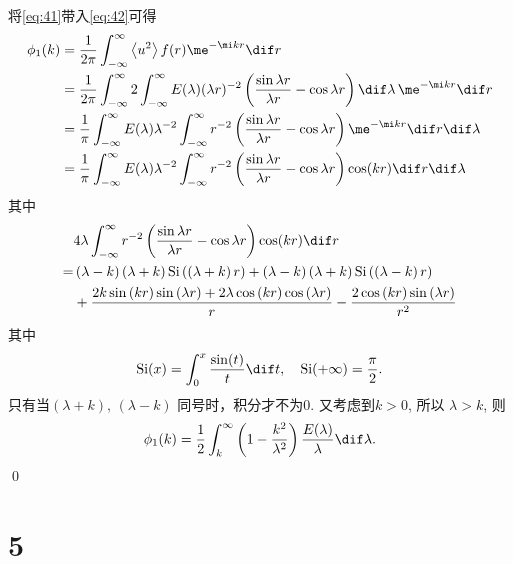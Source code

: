 \documentclass[12pt,a4]{ctexart}
\begin{document}
将\cref{eq:41}带入\cref{eq:42}可得
\begin{equation}
   \begin{aligned}
	  \phi_{1}(k) & = \frac{1}{2 \pi} \int_{-\infty}^{\infty}\left\langle u^{2}\right\rangle f(r) \me^{-\mi k r} \dif r \\ 
				  & = \frac{1}{2 \pi} \int_{-\infty}^{\infty}2 \int_{-\infty}^{\infty} E(\lambda)(\lambda r)^{-2}\left(\frac{\sin \lambda r}{\lambda r}-\cos \lambda r\right)\dif \lambda \, \me^{-\mi k r} \dif r \\
				  & = \frac{1}{ \pi} \int_{-\infty}^{\infty}E(\lambda) \lambda^{-2} \int_{-\infty}^{\infty}  r^{-2}\left(\frac{\sin \lambda r}{\lambda r}-\cos \lambda r\right) \me^{-\mi k r} \dif r \dif \lambda \\
				  & = \frac{1}{ \pi} \int_{-\infty}^{\infty}E(\lambda) \lambda^{-2} \int_{-\infty}^{\infty}  r^{-2}\left(\frac{\sin \lambda r}{\lambda r}-\cos \lambda r\right) \cos(kr) \dif r \dif \lambda \\
   \end{aligned}
\end{equation}
其中
\begin{equation}
   \begin{aligned}
	 & 4\lambda\int_{-\infty}^{\infty}  r^{-2}\left(\frac{\sin \lambda r}{\lambda r}-\cos \lambda r\right) \cos(kr) \dif r \\ 
	  = & \left(\lambda-k\right)\left(\lambda+k\right)\operatorname{Si}\left(\left(\lambda+k\right)r\right)+\left(\lambda-k\right)\left(\lambda+k\right)\operatorname{Si}\left(\left(\lambda-k\right)r\right)\\
		& +\frac{2k\sin\left(kr\right)\sin\left(\lambda r\right)+2\lambda \cos\left(kr\right)\cos\left(\lambda r\right)}{r}-\frac{2\cos\left(kr\right)\sin\left(\lambda r\right)}{r^2}
   \end{aligned}
\end{equation}
其中
\begin{equation}
   \mathrm{Si}(x) = \int^x_0 \frac{\sin(t)}{t} \dif t,\quad \mathrm{Si}(+\infty) = \frac{\pi}{2}.
\end{equation}
只有当$\left( \lambda + k \right),\, \left( \lambda - k \right) $ 同号时，积分才不为$0$. 又考虑到$k>0$, 所以 $\lambda > k$, 则
\begin{equation}
   \phi_{1}(k)=\frac{1}{2} \int_{k}^{\infty}\left(1-\frac{k^{2}}{\lambda^{2}}\right) \frac{E(\lambda)}{\lambda} \dif \lambda.
\end{equation}
\qed


\section{5}
\end{document}
